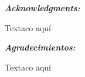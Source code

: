{}
\newpage

\begin{center}
\noindent
\textbf{\emph{\Large Acknowledgments:}}
\vspace{4cm}
\end{center}

Textaco aquí

\newpage
\afterpage{\blankpage}
\newpage


\begin{center}
\noindent
\textbf{\emph{\Large Agradecimientos:}}
\vspace{4cm}
\end{center}


Textaco aquí

\afterpage{\blankpage}
